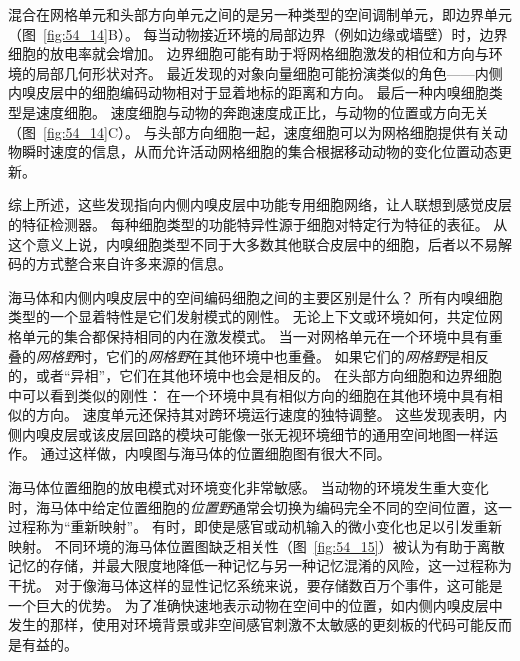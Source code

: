 混合在网格单元和头部方向单元之间的是另一种类型的空间调制单元，即边界单元（图~\ref{fig:54_14}B）。
每当动物接近环境的局部边界（例如边缘或墙壁）时，边界细胞的放电率就会增加。
边界细胞可能有助于将网格细胞激发的相位和方向与环境的局部几何形状对齐。
最近发现的对象向量细胞可能扮演类似的角色——内侧内嗅皮层中的细胞编码动物相对于显着地标的距离和方向。
最后一种内嗅细胞类型是速度细胞。
速度细胞与动物的奔跑速度成正比，与动物的位置或方向无关（图~\ref{fig:54_14}C）。
与头部方向细胞一起，速度细胞可以为网格细胞提供有关动物瞬时速度的信息，从而允许活动网格细胞的集合根据移动动物的变化位置动态更新。


综上所述，这些发现指向内侧内嗅皮层中功能专用细胞网络，让人联想到感觉皮层的特征检测器。
每种细胞类型的功能特异性源于细胞对特定行为特征的表征。
从这个意义上说，内嗅细胞类型不同于大多数其他联合皮层中的细胞，后者以不易解码的方式整合来自许多来源的信息。


海马体和内侧内嗅皮层中的空间编码细胞之间的主要区别是什么？
所有内嗅细胞类型的一个显着特性是它们发射模式的刚性。
无论上下文或环境如何，共定位网格单元的集合都保持相同的内在激发模式。
当一对网格单元在一个环境中具有重叠的\textit{网格野}时，它们的\textit{网格野}在其他环境中也重叠。
如果它们的\textit{网格野}是相反的，或者“异相”，它们在其他环境中也会是相反的。
在头部方向细胞和边界细胞中可以看到类似的刚性：
在一个环境中具有相似方向的细胞在其他环境中具有相似的方向。
速度单元还保持其对跨环境运行速度的独特调整。
这些发现表明，内侧内嗅皮层或该皮层回路的模块可能像一张无视环境细节的通用空间地图一样运作。
通过这样做，内嗅图与海马体的位置细胞图有很大不同。


海马体位置细胞的放电模式对环境变化非常敏感。
当动物的环境发生重大变化时，海马体中给定位置细胞的\textit{位置野}通常会切换为编码完全不同的空间位置，这一过程称为“重新映射”。
有时，即使是感官或动机输入的微小变化也足以引发重新映射。
不同环境的海马体位置图缺乏相关性（图~\ref{fig:54_15}）被认为有助于离散记忆的存储，并最大限度地降低一种记忆与另一种记忆混淆的风险，这一过程称为干扰。
对于像海马体这样的显性记忆系统来说，要存储数百万个事件，这可能是一个巨大的优势。
为了准确快速地表示动物在空间中的位置，如内侧内嗅皮层中发生的那样，使用对环境背景或非空间感官刺激不太敏感的更刻板的代码可能反而是有益的。



